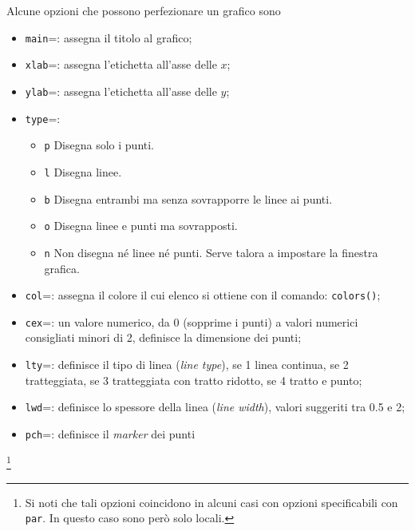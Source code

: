 \documentclass[onecolumn,11pt]{book}
\begin{document}
Alcune opzioni che possono perfezionare un grafico sono
\begin{itemize}
\item{}\texttt{main}=: assegna il titolo al grafico; 
\item{}\texttt{xlab}=: assegna l'etichetta all'asse delle $x$; 
\item{}\texttt{ylab}=: assegna l'etichetta all'asse delle $y$;
\item{}\texttt{type}=: 
\begin{itemize}
\item{} \texttt{p} Disegna solo i punti.
\item{} \texttt{l} Disegna linee.
\item{} \texttt{b} Disegna entrambi ma senza
sovrapporre le linee ai punti.
\item{} \texttt{o} Disegna linee e punti ma sovrapposti.
\item{} \texttt{n} Non disegna n\'e linee n\'e punti. Serve talora a impostare la finestra grafica.
\end{itemize}
\item{} \texttt{col}=: assegna il colore il cui elenco si ottiene con il comando: \texttt{colors()};
\item{} \texttt{cex}=: un valore numerico, da 0 (sopprime i punti) a valori numerici consigliati minori di 2, definisce la dimensione dei punti; 
\item{}\texttt{lty}=: definisce il tipo di linea ({\it line type}), se 1 linea continua, se 2 tratteggiata, se 3 tratteggiata con tratto ridotto, se 4 tratto e punto;  
\item{}\texttt{lwd}=: definisce lo spessore della linea ({\it line width}), valori suggeriti tra 0.5 e 2;
\item{} \texttt{pch}=: definisce il \emph{marker} dei punti
\end{itemize}
\footnote{Si noti che tali opzioni coincidono in alcuni casi con opzioni specificabili con \texttt{par}.  In questo caso sono per\`o solo locali. }
 
\end{document}
